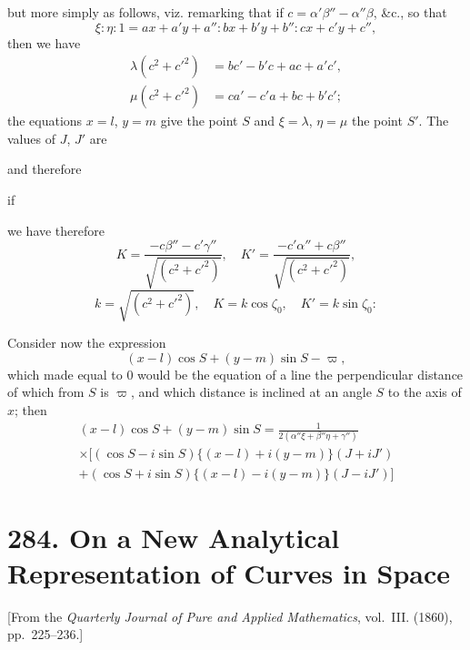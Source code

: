 \documentclass[11pt,a4paper]{article}
\theoremstyle{plain}
\begin{document}
but more simply as follows, viz. remarking that if $c = \alpha'\beta'' - \alpha''\beta$, \&c., so that
\[
\xi : \eta : 1 = ax + a'y + a'' : bx + b'y + b'' : cx + c'y + c'',
\]
then we have
\begin{align*}
\lambda(c^2 + c'^2) &= bc' - b'c + ac + a'c',\\
\mu(c^2 + c'^2) &= ca' - c'a + bc + b'c';
\end{align*}
the equations $x = l$, $y = m$ give the point $S$ and $\xi = \lambda$, $\eta = \mu$ the point $S'$. The values of $J$, $J'$ are

and therefore

if

we have therefore
\[
K = \frac{-c\beta'' - c'\gamma''}{\sqrt{(c^2 + c'^2)}},\quad K' = \frac{-c'\alpha'' + c\beta''}{\sqrt{(c^2 + c'^2)}},
\]
\[
k = \sqrt{(c^2 + c'^2)},\quad K = k\cos\zeta_0,\quad K' = k\sin\zeta_0:
\]

Consider now the expression
\[
(x - l)\cos S + (y - m)\sin S - \varpi,
\]
which made equal to 0 would be the equation of a line the perpendicular distance of which from $S$ is $\varpi$, and which distance is inclined at an angle $S$ to the axis of $x$; then
\begin{multline*}
(x - l)\cos S + (y - m)\sin S = \frac{1}{2(\alpha''\xi + \beta''\eta + \gamma'')}\\
\times[(\cos S - i\sin S)\{(x - l) + i(y - m)\}(J + iJ')\\
+ (\cos S + i\sin S)\{(x - l) - i(y - m)\}(J - iJ')]
\end{multline*}


\newpage
\section*{284. On a New Analytical Representation of Curves in Space}
\label{sec:284}

[From the \textit{Quarterly Journal of Pure and Applied Mathematics}, vol.~III. (1860), pp.~225--236.]
\end{document}
